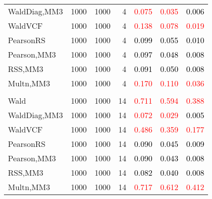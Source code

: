 \documentclass[
]{article}
\begin{document}
\begin{table}[H]
{\begin{tabular}[t]{lrrrrrr}
\hspace{1em}WaldDiag,MM3 & 1000 & 1000 & 4 & \textcolor{red}{0.075} & \textcolor{red}{0.035} & \textcolor{black}{0.006}\\
\hspace{1em}WaldVCF & 1000 & 1000 & 4 & \textcolor{red}{0.138} & \textcolor{red}{0.078} & \textcolor{red}{0.019}\\
\hspace{1em}PearsonRS & 1000 & 1000 & 4 & \textcolor{black}{0.099} & \textcolor{black}{0.055} & \textcolor{black}{0.010}\\
\hspace{1em}Pearson,MM3 & 1000 & 1000 & 4 & \textcolor{black}{0.097} & \textcolor{black}{0.048} & \textcolor{black}{0.008}\\
\hspace{1em}RSS,MM3 & 1000 & 1000 & 4 & \textcolor{black}{0.091} & \textcolor{black}{0.050} & \textcolor{black}{0.008}\\
\hspace{1em}Multn,MM3 & 1000 & 1000 & 4 & \textcolor{red}{0.170} & \textcolor{red}{0.110} & \textcolor{red}{0.036}\\
\addlinespace[0.3em]
\multicolumn{7}{l}{\textbf{1F 15V}}\\
\hspace{1em}Wald & 1000 & 1000 & 14 & \textcolor{red}{0.711} & \textcolor{red}{0.594} & \textcolor{red}{0.388}\\
\hspace{1em}WaldDiag,MM3 & 1000 & 1000 & 14 & \textcolor{red}{0.072} & \textcolor{red}{0.029} & \textcolor{black}{0.005}\\
\hspace{1em}WaldVCF & 1000 & 1000 & 14 & \textcolor{red}{0.486} & \textcolor{red}{0.359} & \textcolor{red}{0.177}\\
\hspace{1em}PearsonRS & 1000 & 1000 & 14 & \textcolor{black}{0.090} & \textcolor{black}{0.045} & \textcolor{black}{0.009}\\
\hspace{1em}Pearson,MM3 & 1000 & 1000 & 14 & \textcolor{black}{0.090} & \textcolor{black}{0.043} & \textcolor{black}{0.008}\\
\hspace{1em}RSS,MM3 & 1000 & 1000 & 14 & \textcolor{black}{0.082} & \textcolor{black}{0.040} & \textcolor{black}{0.008}\\
\hspace{1em}Multn,MM3 & 1000 & 1000 & 14 & \textcolor{red}{0.717} & \textcolor{red}{0.612} & \textcolor{red}{0.412}\\

\end{tabular}}
\end{table}
\end{document}
